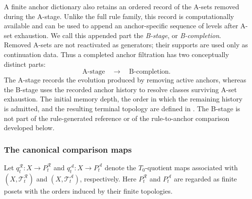 \documentclass[a4paper,11pt]{article}
\theoremstyle{definition}
\theoremstyle{remark}
\begin{document}
A finite anchor dictionary also retains an ordered record of the A-sets removed during the A-stage. Unlike the full rule family, this record is computationally available and can be used to append an anchor-specific sequence of levels after A-set exhaustion. We call this appended part the \emph{B-stage}, or \emph{B-completion}.  Removed A-sets are not reactivated as generators; their supports are used only as continuation data. Thus a completed anchor filtration has two conceptually distinct parts:
$$
\boxed{
\text{A-stage}\quad \longrightarrow\quad \text{B-completion}.
}
$$
The A-stage records the evolution produced by removing active anchors, whereas the B-stage uses the recorded anchor history to resolve classes surviving A-set exhaustion. The initial memory depth, the order in which the remaining history is admitted, and the resulting terminal topology are defined in . The B-stage is not part of the rule-generated reference or of the rule-to-anchor comparison developed below.

\subsubsection*{The canonical comparison maps}

Let $q_t^{\mathcal R}\colon X\to P_t^{\mathcal R}$ and $q_t^{\mathcal A}\colon X\to P_t^{\mathcal A}$ denote the $T_0$-quotient maps associated with $(X,\mathcal T_t^{\mathcal R})$ and $(X,\mathcal T_t^{\mathcal A})$, respectively. Here $P_t^{\mathcal R}$ and $P_t^{\mathcal A}$ are regarded as finite posets with the orders induced by their finite topologies.
\end{document}
